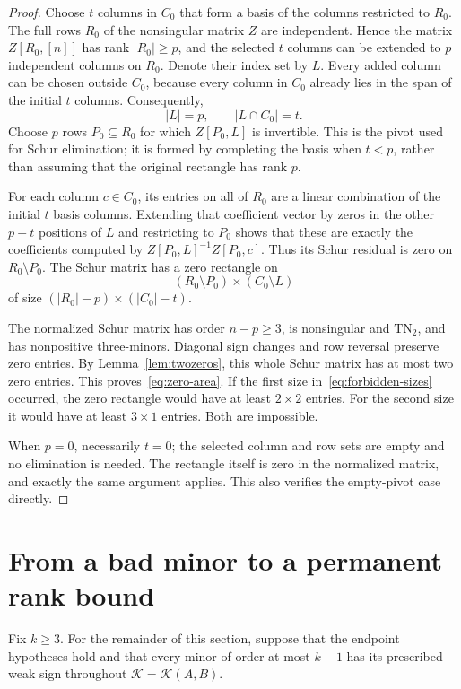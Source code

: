 \documentclass[11pt]{article}
\theoremstyle{definition}
\theoremstyle{remark}
\numberwithin{equation}{section}
\newcommand{\K}{\mathcal K}
\begin{document}
\begin{proof}
Choose $t$ columns in $C_0$ that form a basis of the columns
restricted to $R_0$. The full rows $R_0$ of the nonsingular matrix
$Z$ are independent. Hence the matrix $Z[R_0,[n]]$ has rank
$|R_0|\geq p$, and the selected $t$ columns can be extended to
$p$ independent columns on $R_0$. Denote their index set by $L$.
Every added column can be chosen outside $C_0$, because every
column in $C_0$ already lies in the span of the initial $t$ columns.
Consequently,
\[
 |L|=p,\qquad |L\cap C_0|=t.
\]
Choose $p$ rows $P_0\subseteq R_0$ for which $Z[P_0,L]$ is
invertible. This is the pivot used for Schur elimination; it is
formed by completing the basis when $t<p$, rather than assuming
that the original rectangle has rank $p$.

For each column $c\in C_0$, its entries on all of $R_0$ are a
linear combination of the initial $t$ basis columns. Extending that
coefficient vector by zeros in the other $p-t$ positions of $L$
and restricting to $P_0$ shows that these are exactly the coefficients
computed by $Z[P_0,L]^{-1}Z[P_0,c]$. Thus its Schur residual is
zero on $R_0\setminus P_0$. The Schur matrix has a zero rectangle
on
\[
 (R_0\setminus P_0)\times(C_0\setminus L)
\]
of size $(|R_0|-p)\times(|C_0|-t)$.

The normalized Schur matrix has order $n-p\geq3$, is nonsingular
and $\mathrm{TN}_2$, and has nonpositive three-minors. Diagonal
sign changes and row reversal preserve zero entries. By
Lemma~\ref{lem:twozeros}, this whole Schur matrix has at most two
zero entries. This proves~\eqref{eq:zero-area}.
If the first size in~\eqref{eq:forbidden-sizes} occurred, the zero
rectangle would have at least $2\times2$ entries. For the second
size it would have at least $3\times1$ entries. Both are impossible.

When $p=0$, necessarily $t=0$; the selected column and row sets
are empty and no elimination is needed. The rectangle itself is
zero in the normalized matrix, and exactly the same argument
applies. This also verifies the empty-pivot case directly.
\end{proof}

\section{From a bad minor to a permanent rank bound}\label{sec:rank}

Fix $k\geq3$. For the remainder of this section, suppose that the
endpoint hypotheses hold and that every minor of order at most
$k-1$ has its prescribed weak sign throughout $\K=\K(A,B)$.
\end{document}
